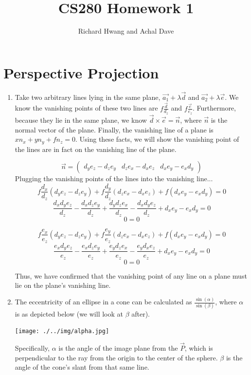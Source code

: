 \documentclass[11pt]{article}
\begin{document}
\title{CS280 Homework 1}
\author{Richard Hwang and Achal Dave}
\maketitle

\section{Perspective Projection}
\begin{enumerate}
\item
    Take two arbitrary lines lying in the same plane,
    $\vec{a_1} + \lambda\vec{d}$ and $\vec{a_2} + \lambda\vec{e}$.  We know
    the vanishing points of these two lines are $f\frac{\vec{d}}{d_z}$ and
    $f\frac{\vec{e}}{e_z}$. Furthermore, because they lie in the same plane, we
    know $\vec{d} \times \vec{e} = \vec{n}$, where $\vec{n}$ is the normal
    vector of the plane. Finally, the vanishing line of a plane is
    $xn_x + yn_y + fn_z = 0$.  Using these facts, we will show the vanishing
    point of the lines are in fact on the vanishing line of the plane.

    $$\vec{n} = \begin{pmatrix}d_ye_z - d_ze_y&d_ze_x-d_xe_z&d_xe_y-e_xd_y\end{pmatrix}$$
    Plugging the vanishing points of the lines into the vanishing line...
    $$f\frac{d_x}{d_z}(d_ye_z - d_ze_y) + f\frac{d_y}{d_z}(d_ze_x-d_xe_z)
    + f(d_xe_y-e_xd_y) = 0$$
    $$\frac{d_xd_ye_z}{d_z} - \frac{d_xd_ze_y}{d_z} + \frac{d_yd_ze_x}{d_z} -
    \frac{d_xd_ye_z}{d_z} + d_xe_y - e_xd_y= 0$$
    $$0 = 0$$

    $$f\frac{e_x}{e_z}(d_ye_z - d_ze_y) + f\frac{e_y}{e_z}(d_ze_x-d_xe_z)
    + f(d_xe_y-e_xd_y) = 0$$
    $$\frac{e_xd_ye_z}{e_z} - \frac{e_xd_ze_y}{e_z} + \frac{e_yd_ze_x}{e_z} -
    \frac{e_yd_xe_z}{e_z} + d_xe_y - e_xd_y= 0$$
    $$0 = 0$$

    Thus, we have confirmed that the vanishing point of any line on a plane
    must lie on the plane's vanishing line.

\item
    The eccentricity of an ellipse in a cone can be calculated as $\frac{\sin(\alpha)}{\sin(\beta)}$,
    where $\alpha$ is as depicted below (we will look at $\beta$ after).

    \texttt{[image: ./../img/alpha.jpg]}

    Specifically, $\alpha$ is the angle of the image plane from the $\vec{P}$,
    which is perpendicular to the ray from the origin to the center of the sphere.
    $\beta$ is the angle of the cone's slant from that same line.


\end{enumerate}
\end{document}
